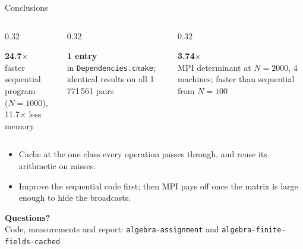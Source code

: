 \documentclass[aspectratio=169,11pt]{beamer}
\newcommand{\stat}[2]{%
  \begin{minipage}[t]{\linewidth}\centering
    {\Huge\bfseries\color{accent}#1}\\[0.3em]
    {\small\color{muted}#2}
  \end{minipage}}
\begin{document}
\begin{frame}{Conclusions}
  \begin{columns}[T]
    \begin{column}{0.32\textwidth}
      \stat{24.7$\times$}{faster sequential program\\($N=1000$), 11.7$\times$ less memory}
    \end{column}
    \begin{column}{0.32\textwidth}
      \stat{1 entry}{in \texttt{Dependencies.cmake}; identical results on all 1\,771\,561 pairs}
    \end{column}
    \begin{column}{0.32\textwidth}
      \stat{3.74$\times$}{MPI determinant at $N=2000$, 4 machines; faster than sequential from $N=100$}
    \end{column}
  \end{columns}
  \vspace{2em}
  \begin{itemize}
    \item Cache at the one class every operation passes through, and reuse its
          arithmetic on misses.
    \item Improve the sequential code first; then MPI pays off once the matrix
          is large enough to hide the broadcasts.
  \end{itemize}
\end{frame}

\begin{frame}[plain]
  \centering\vfill
  {\Huge\bfseries\color{accent} Questions?}\\[1em]
  {\small\color{muted}Code, measurements and report:
   \texttt{algebra-assignment} and \texttt{algebra-finite-fields-cached}}
  \vfill
\end{frame}
\end{document}
